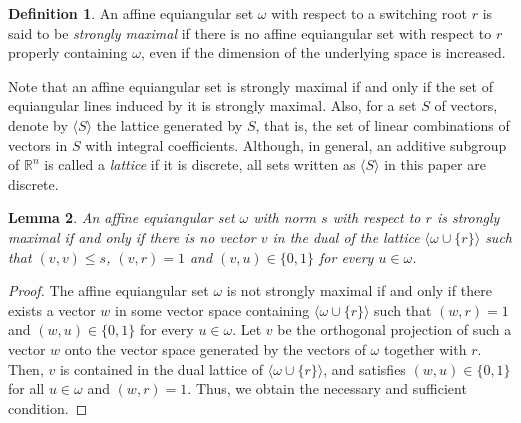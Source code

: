 \documentclass[reqno, 11pt]{amsart}
\numberwithin{equation}{section}
\newtheorem{lem}{Lemma}[section]
\theoremstyle{definition}
\newtheorem{dfn}[lem]{Definition}%
\newcommand{\aes}{\omega}
\newcommand{\R}{\mathbb{R}}
\begin{document}
\begin{dfn}
	An affine equiangular set $\aes$ with respect to a switching root $r$ is said to be \emph{strongly maximal}
	if there is no affine equiangular set with respect to $r$ properly containing $\aes$, even if the dimension of the underlying space is increased.
\end{dfn}

Note that an affine equiangular set is strongly maximal if and only if the set of equiangular lines induced by it is strongly maximal.
Also, for a set $S$ of vectors, denote by $\langle S \rangle$ the lattice generated by $S$, that is, the set of linear combinations of vectors in $S$ with integral coefficients.
Although, in general, an additive subgroup of $\R^n$ is called a \emph{lattice} if it is discrete,
all sets written as $\langle S \rangle$ in this paper are discrete. %

\begin{lem}	\label{lem:strongly maximal}
	An affine equiangular set $\aes$ with norm $s$ with respect to $r$ is strongly maximal
	if and only if
	there is no vector $v$ in the dual of the lattice $\langle \aes \cup \{r\} \rangle$ such that $(v,v) \le s$, $(v,r) = 1$ and $(v, u) \in \{0,1\}$ for every $u \in \aes$.
\end{lem}
\begin{proof}
	The affine equiangular set $\aes$ is not strongly maximal if and only if there exists a vector $w$ in some vector space containing $\langle \aes \cup \{r\} \rangle$ such that $(w,r) = 1$ and $(w,u) \in \{0,1\}$ for every $u \in \aes$.
	Let $v$ be the orthogonal projection of such a vector $w$ onto the vector space generated by the vectors of $\aes$ together with $r$.
	Then, $v$ is contained in the dual lattice of $\langle \aes \cup \{r\} \rangle$,
	and satisfies $(w,u) \in \{0,1\}$ for all $u \in \aes$ and $(w,r) = 1$.
	Thus, we obtain the necessary and sufficient condition.
\end{proof}
\end{document}

